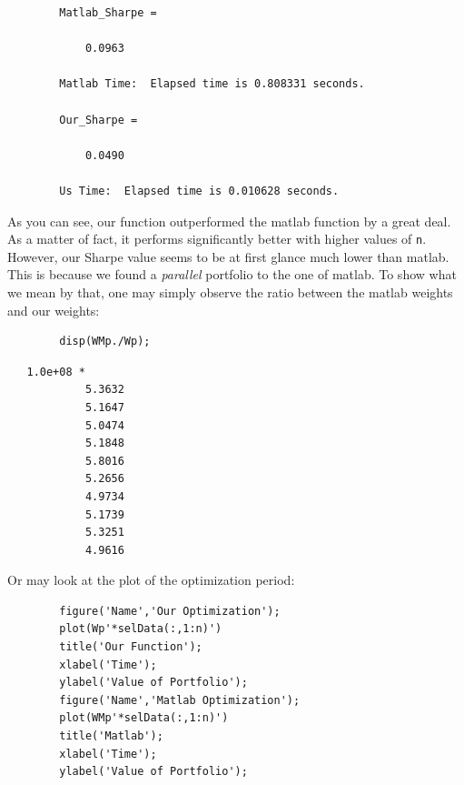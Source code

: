 \documentclass[12pt,titlepage,letter]{article}
\begin{document}
    \color{lightgray} \begin{lstlisting}
		Matlab_Sharpe =

    		0.0963

		Matlab Time:  Elapsed time is 0.808331 seconds.

		Our_Sharpe =

		    0.0490

		Us Time:  Elapsed time is 0.010628 seconds.
	\end{lstlisting} \color{black}
    \begin{par}
		As you can see, our function outperformed the matlab function by a great deal. As a matter of fact, it performs significantly better with higher values of \texttt{n}. However, our Sharpe value seems to be at first glance much lower than matlab. This is because we found a \textit{parallel} portfolio to the one of matlab. To show what we mean by that, one may simply observe the ratio between the matlab weights and our weights:
	\end{par} \vspace{1em}
	\begin{lstlisting}
		disp(WMp./Wp);
	\end{lstlisting}
        \color{lightgray} \begin{lstlisting}   1.0e+08 *
		    5.3632
		    5.1647
		    5.0474
		    5.1848
		    5.8016
		    5.2656
		    4.9734
		    5.1739
		    5.3251
		    4.9616

	\end{lstlisting} \color{black}
    \begin{par}
		Or may look at the plot of the optimization period:
	\end{par} \vspace{1em}
	\begin{lstlisting}
		figure('Name','Our Optimization');
		plot(Wp'*selData(:,1:n)')
		title('Our Function');
		xlabel('Time');
		ylabel('Value of Portfolio');
		figure('Name','Matlab Optimization');
		plot(WMp'*selData(:,1:n)')
		title('Matlab');
		xlabel('Time');
		ylabel('Value of Portfolio');
	\end{lstlisting}
\end{document}
